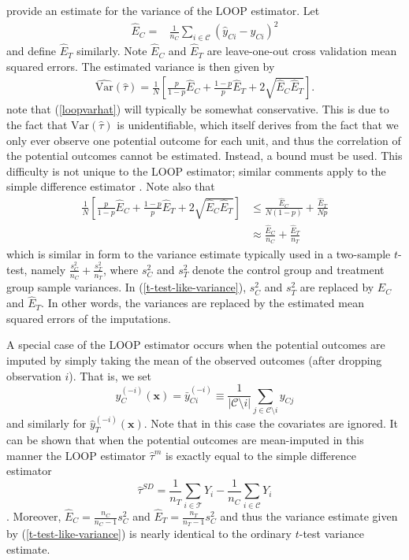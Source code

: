 \cite{loop} provide an estimate for the variance of the LOOP estimator.  Let
\begin{align}
\hat{E}_C = & \frac{1}{n_C}\sum_{i \in \mathcal{C}}(\hat{y}_{Ci} - y_{Ci})^2 \label{Echat}
\end{align}
and define $\hat{E}_T$ similarly.  Note $\hat{E}_C$ and $\hat{E}_T$ are leave-one-out cross validation mean squared errors.  The estimated variance is then given by
\begin{align}
\widehat{\mathrm{Var}}(\hat{\tau}) =  \frac{1}{N}\left[\frac{p}{1-p}\hat{E}_C + \frac{1-p}{p}\hat{E}_T + 2\sqrt{\hat{E}_C\hat{E}_T}\right]. \label{loopvarhat}
\end{align}
\cite{loop} note that (\ref{loopvarhat}) will typically be somewhat conservative.  This is due to the fact that $\mathrm{Var}(\hat{\tau})$ is unidentifiable, which itself derives from the fact that we only ever observe one potential outcome for each unit, and thus the correlation of the potential outcomes cannot be estimated.  Instead, a bound must be used.  This difficulty is not unique to the LOOP estimator; similar comments apply to the simple difference estimator \citep{aronow2014}.  Note also that
\begin{align}
\frac{1}{N}\left[\frac{p}{1-p}\hat{E}_C + \frac{1-p}{p}\hat{E}_T + 2\sqrt{\hat{E}_C\hat{E}_T}\right]
&\le
\frac{\hat{E}_C}{N(1-p)} + \frac{\hat{E}_T}{Np} \\
&\approx
\frac{\hat{E}_C}{n_C} + \frac{\hat{E}_T}{n_T} \label{t-test-like-variance}
\end{align}
which is similar in form to the variance estimate typically used in a two-sample $t$-test, namely $\frac{s^2_C}{n_C} + \frac{s^2_T}{n_T}$, where $s^2_C$ and $s^2_T$ denote the control group and treatment group sample variances.  In (\ref{t-test-like-variance}), $s^2_C$ and $s^2_T$ are replaced by $\hat{E}_C$ and $\hat{E}_T$.  In other words, the variances are replaced by the estimated mean squared errors of the imputations.

A special case of the LOOP estimator occurs when the potential outcomes are imputed by simply taking the mean of the observed  outcomes (after dropping observation $i$).  That is, we set
\begin{equation}
\hat{y}^{(-i)}_C(\mathbf{x}) = \bar{y}^{(-i)}_{Ci}\equiv \frac{1}{|{\mathcal{C}\setminus i}|}\sum_{j \in \mathcal{C} \setminus i} y_{Cj}
\end{equation}
and similarly for $\hat{y}^{(-i)}_T(\mathbf{x})$.  Note that in this case the covariates are ignored.  It can be shown that when the potential outcomes are mean-imputed in this manner the LOOP estimator $\hat{\tau}^{m}$ is exactly equal to the simple difference estimator
\begin{equation}
\hat{\tau}^{SD} = \frac{1}{n_T}\sum_{i \in \mathcal{T}}Y_i - \frac{1}{n_C}\sum_{i \in \mathcal{C}}Y_i
\end{equation}
\citep{loop}.  Moreover, $\hat{E}_C = \frac{n_C}{n_C-1}s^2_C$ and $\hat{E}_T = \frac{n_T}{n_T-1}s^2_C$ and thus the variance estimate given by (\ref{t-test-like-variance}) is nearly identical to the ordinary $t$-test variance estimate.

